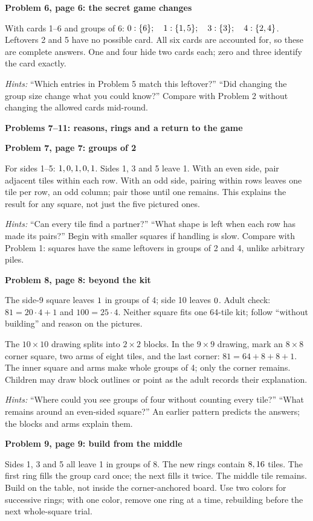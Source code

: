 \documentclass[11pt]{article}
\newcommand{\head}[1]{\par\textbf{\large #1}\par}
\newcommand{\sub}[1]{\par\textbf{#1}\par}
\begin{document}
\sub{Problem 6, page 6: the secret game changes}
With cards 1--6 and groups of 6: $0:\{6\};\quad 1:\{1, 5\};\quad 3:\{3\};\quad 4:\{2, 4\}$. Leftovers 2 and 5 have no possible card. All six cards are accounted for, so these are complete answers. One and four hide two cards each; zero and three identify the card exactly.

\textit{Hints:} ``Which entries in Problem 5 match this leftover?'' ``Did changing the group size change what you could know?'' Compare with Problem 2 without changing the allowed cards mid-round.

\newpage
\head{Problems 7--11: reasons, rings and a return to the game}
\sub{Problem 7, page 7: groups of 2}
For sides 1--5: $1, 0, 1, 0, 1$. Sides 1, 3 and 5 leave 1. With an even side, pair adjacent tiles within each row. With an odd side, pairing within rows leaves one tile per row, an odd column; pair those until one remains. This explains the result for any square, not just the five pictured ones.

\textit{Hints:} ``Can every tile find a partner?'' ``What shape is left when each row has made its pairs?'' Begin with smaller squares if handling is slow. Compare with Problem 1: squares have the same leftovers in groups of 2 and 4, unlike arbitrary piles.

\sub{Problem 8, page 8: beyond the kit}
The side-9 square leaves $1$ in groups of 4; side 10 leaves $0$. Adult check: $81=20\cdot4+1$ and $100=25\cdot4$. Neither square fits one 64-tile kit; follow ``without building'' and reason on the pictures.

The $10\times10$ drawing splits into $2\times2$ blocks. In the $9\times9$ drawing, mark an $8\times8$ corner square, two arms of eight tiles, and the last corner: $81=64+8+8+1$. The inner square and arms make whole groups of 4; only the corner remains. Children may draw block outlines or point as the adult records their explanation.

\textit{Hints:} ``Where could you see groups of four without counting every tile?'' ``What remains around an even-sided square?'' An earlier pattern predicts the answers; the blocks and arms explain them.

\sub{Problem 9, page 9: build from the middle}
Sides 1, 3 and 5 all leave 1 in groups of 8. The new rings contain $8, 16$ tiles. The first ring fills the group card once; the next fills it twice. The middle tile remains. Build on the table, not inside the corner-anchored board. Use two colors for successive rings; with one color, remove one ring at a time, rebuilding before the next whole-square trial.
\end{document}
